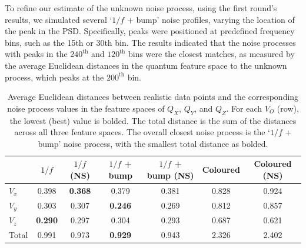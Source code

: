 \documentclass[12pt]{iopart}
\begin{document}
To refine our estimate of the unknown noise process, using the first round's results, we simulated several `$1/f$ + bump' noise profiles, varying the location of the peak in the PSD. Specifically, peaks were positioned at predefined frequency bins, such as the 15th or 30th bin. The results indicated that the noise processes with peaks in the $240^\mathrm{th}$ and $120^\mathrm{th}$ bins were the closest matches, as measured by the average Euclidean distances in the quantum feature space to the unknown process, which peaks at the $200^\mathrm{th}$ bin.

\begin{table}[ht]
    \centering
    \begin{tabular}{lcccccc}
        \toprule
              & $1/f$          & $1/f$ (NS)     & $1/f$ + bump   & $1/f$ + bump (NS) & Coloured & Coloured (NS) \\
        \midrule
        $V_x$ & 0.398          & \textbf{0.368} & 0.379          & 0.381             & 0.828    & 0.924         \\
        $V_y$ & 0.303          & 0.307          & \textbf{0.246} & 0.269             & 0.812    & 0.857         \\
        $V_z$ & \textbf{0.290} & 0.297          & 0.304          & 0.293             & 0.687    & 0.621         \\
        \midrule
        Total & 0.991          & 0.973          & \textbf{0.929} & 0.943             & 2.326    & 2.402         \\
        \bottomrule
    \end{tabular}
    \caption{Average Euclidean distances between realistic data points and the corresponding noise process values in the feature spaces of \(Q_X\), \(Q_Y\), and \(Q_Z\). For each \(V_O\) (row), the lowest (best) value is bolded. The total distance is the sum of the distances across all three feature spaces. The overall closest noise process is the `$1/f$ + bump' noise process, with the smallest total distance as bolded.}
    \label{tab:noise_profiles}
\end{table}
\end{document}
